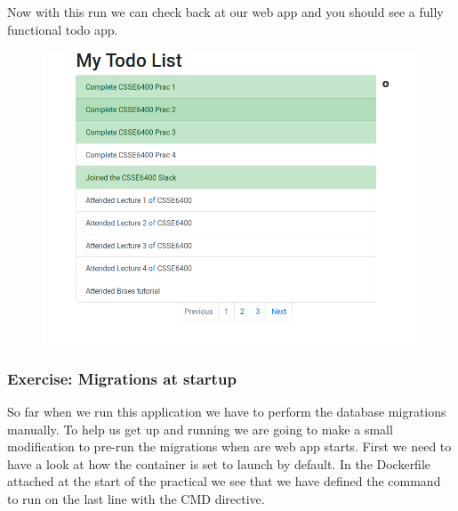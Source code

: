 \documentclass{csse4400}
\begin{document}
\noindent Now with this run we can check back at our web app and you should see a fully 
functional todo app.

\begin{figure}[ht]
\includegraphics[width=\textwidth]{images/todoapp}
\end{figure}


\subsubsection{Exercise: Migrations at startup}

So far when we run this application we have to perform the database migrations manually. 
To help us get up and running we are going to make a small modification to pre-run the migrations when are web app starts.
First we need to have a look at how the container is set to launch by default.
In the Dockerfile attached at the start of the practical we see that we have defined the command to run on the last line with the CMD directive.
\end{document}
